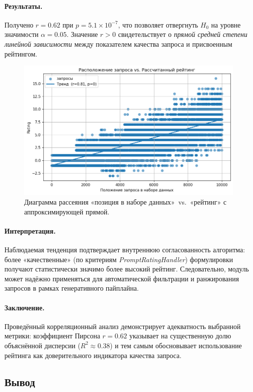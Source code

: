 \paragraph{Результаты.}
Получено $r=0.62$ при $p=5.1\times10^{-7}$, что позволяет отвергнуть $H_0$ на уровне значимости $\alpha=0.05$.  
Значение $r>0$ свидетельствует о \emph{прямой средней степени линейной зависимости} между показателем качества запроса и присвоенным рейтингом.

\begin{figure}[ht]
  \centering
  \includegraphics[width=.8\linewidth]{picture/rating-service-analitics.png}
  \caption{Диаграмма рассеяния «позиция в наборе данных»~vs.~«рейтинг» с аппроксимирующей прямой.}
\label{fig:scatter_rating}
\end{figure}

\paragraph{Интерпретация.}
Наблюдаемая тенденция подтверждает внутреннюю согласованность алгоритма: более «качественные» (по критериям \textit{PromptRatingHandler}) формулировки получают статистически значимо более высокий рейтинг. Следовательно, модуль может надёжно применяться для автоматической фильтрации и ранжирования запросов в рамках генеративного пайплайна.

\paragraph{Заключение.}
Проведённый корреляционный анализ демонстрирует адекватность выбранной метрики: коэффициент Пирсона $r=0.62$ указывает на существенную долю объяснённой дисперсии ($R^2\approx0.38$) и тем самым обосновывает использование рейтинга как доверительного индикатора качества запроса\cite{wiki:mrr}.


\subsection{Вывод}


